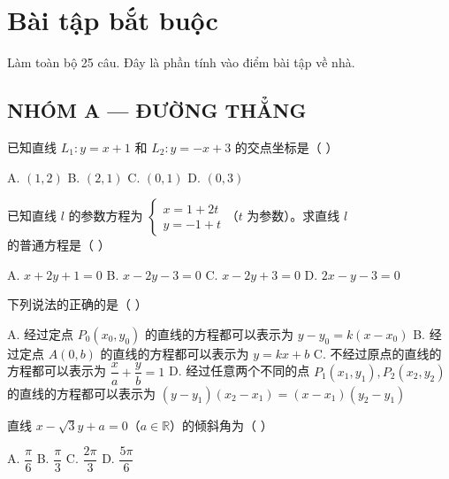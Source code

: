 \documentclass[11pt, a4paper]{article}
\begin{document}

\section{Bài tập bắt buộc}

Làm toàn bộ 25 câu. Đây là phần tính vào điểm bài tập về nhà.

\subsection*{NHÓM A — ĐƯỜNG THẲNG}

\begin{baitap}[1]
已知直线 $L_1: y = x + 1$ 和 $L_2: y = -x + 3$ 的交点坐标是（ ）
\par\vspace{3pt}
\noindent A. $(1,2)$ \quad B. $(2,1)$ \quad C. $(0,1)$ \quad D. $(0,3)$
\end{baitap}

\begin{baitap}[2]
已知直线 $l$ 的参数方程为 $\begin{cases} x = 1 + 2t \\ y = -1 + t \end{cases}$（$t$ 为参数）。求直线 $l$ 的普通方程是（ ）
\par\vspace{3pt}
\noindent A. $x + 2y + 1 = 0$ \quad B. $x - 2y - 3 = 0$ \quad C. $x - 2y + 3 = 0$ \quad D. $2x - y - 3 = 0$
\end{baitap}

\begin{baitap}[3]
下列说法的正确的是（ ）
\par\vspace{3pt}
\noindent A. 经过定点 $P_0(x_0, y_0)$ 的直线的方程都可以表示为 $y - y_0 = k(x - x_0)$ \quad B. 经过定点 $A(0, b)$ 的直线的方程都可以表示为 $y = kx + b$ \quad C. 不经过原点的直线的方程都可以表示为 $\dfrac{x}{a} + \dfrac{y}{b} = 1$ \quad D. 经过任意两个不同的点 $P_1(x_1, y_1), P_2(x_2, y_2)$ 的直线的方程都可以表示为 $(y - y_1)(x_2 - x_1) = (x - x_1)(y_2 - y_1)$
\end{baitap}

\begin{baitap}[4]
直线 $x - \sqrt{3}y + a = 0$（$a \in \mathbb{R}$）的倾斜角为（ ）
\par\vspace{3pt}
\noindent A. $\dfrac{\pi}{6}$ \quad B. $\dfrac{\pi}{3}$ \quad C. $\dfrac{2\pi}{3}$ \quad D. $\dfrac{5\pi}{6}$
\end{baitap}
\end{document}

